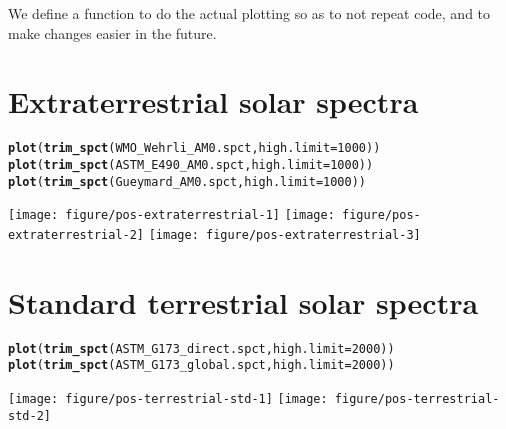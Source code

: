 \documentclass{article}\usepackage[]{graphicx}\usepackage[]{color}
\makeatletter
\newcommand{\hlnum}[1]{\textcolor[rgb]{0.686,0.059,0.569}{#1}}%
\newcommand{\hlstd}[1]{\textcolor[rgb]{0.345,0.345,0.345}{#1}}%
\newcommand{\hlkwc}[1]{\textcolor[rgb]{0.333,0.667,0.333}{#1}}%
\newcommand{\hlkwd}[1]{\textcolor[rgb]{0.737,0.353,0.396}{\textbf{#1}}}%
\newenvironment{kframe}{%
 \def\at@end@of@kframe{}%
 \ifinner\ifhmode%
  \def\at@end@of@kframe{\end{minipage}}%
  \begin{minipage}{\columnwidth}%
 \fi\fi%
 \def\FrameCommand##1{\hskip\@totalleftmargin \hskip-\fboxsep
 \colorbox{shadecolor}{##1}\hskip-\fboxsep
     \hskip-\linewidth \hskip-\@totalleftmargin \hskip\columnwidth}%
 \MakeFramed {\advance\hsize-\width
   \@totalleftmargin\z@ \linewidth\hsize
   \@setminipage}}%
 {\par\unskip\endMakeFramed%
 \at@end@of@kframe}
\newenvironment{knitrout}{}{} %
\makeatother
\begin{document}
We define a function to do the actual plotting so as to not repeat code, and to make changes easier in the future.

\section{Extraterrestrial solar spectra}

\begin{knitrout}\footnotesize
{}\color{fgcolor}\begin{kframe}
\begin{alltt}
  \hlkwd{plot}\hlstd{(}\hlkwd{trim_spct}\hlstd{(WMO_Wehrli_AM0.spct,} \hlkwc{high.limit}\hlstd{=}\hlnum{1000}\hlstd{))}
  \hlkwd{plot}\hlstd{(}\hlkwd{trim_spct}\hlstd{(ASTM_E490_AM0.spct,} \hlkwc{high.limit}\hlstd{=}\hlnum{1000}\hlstd{))}
  \hlkwd{plot}\hlstd{(}\hlkwd{trim_spct}\hlstd{(Gueymard_AM0.spct,} \hlkwc{high.limit}\hlstd{=}\hlnum{1000}\hlstd{))}
\end{alltt}
\end{kframe}

{\centering \texttt{[image: figure/pos-extraterrestrial-1]} 
\texttt{[image: figure/pos-extraterrestrial-2]} 
\texttt{[image: figure/pos-extraterrestrial-3]} 

}



\end{knitrout}

\section{Standard terrestrial solar spectra}

\begin{knitrout}\footnotesize
{}\color{fgcolor}\begin{kframe}
\begin{alltt}
  \hlkwd{plot}\hlstd{(}\hlkwd{trim_spct}\hlstd{(ASTM_G173_direct.spct,} \hlkwc{high.limit}\hlstd{=}\hlnum{2000}\hlstd{))}
  \hlkwd{plot}\hlstd{(}\hlkwd{trim_spct}\hlstd{(ASTM_G173_global.spct,} \hlkwc{high.limit}\hlstd{=}\hlnum{2000}\hlstd{))}
\end{alltt}
\end{kframe}

{\centering \texttt{[image: figure/pos-terrestrial-std-1]} 
\texttt{[image: figure/pos-terrestrial-std-2]} 

}



\end{knitrout}
\end{document}
